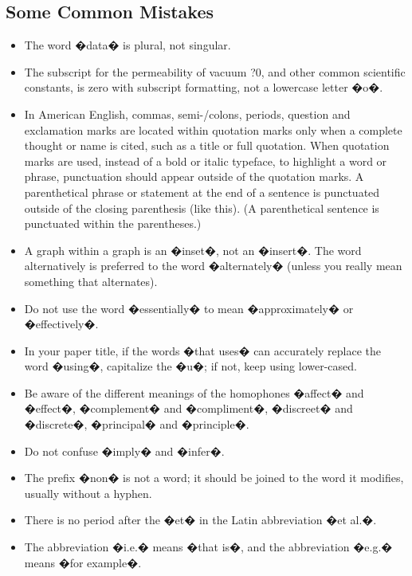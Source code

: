 \documentclass[letterpaper, 10 pt, conference]{IEEEconf}  %
\begin{document}
        \subsection{Some Common Mistakes}
        \begin{itemize}
        
        
        \item The word �data� is plural, not singular.
        \item The subscript for the permeability of vacuum ?0, and other common scientific constants, is zero with subscript formatting, not a lowercase letter �o�.
        \item In American English, commas, semi-/colons, periods, question and exclamation marks are located within quotation marks only when a complete thought or name is cited, such as a title or full quotation. When quotation marks are used, instead of a bold or italic typeface, to highlight a word or phrase, punctuation should appear outside of the quotation marks. A parenthetical phrase or statement at the end of a sentence is punctuated outside of the closing parenthesis (like this). (A parenthetical sentence is punctuated within the parentheses.)
        \item A graph within a graph is an �inset�, not an �insert�. The word alternatively is preferred to the word �alternately� (unless you really mean something that alternates).
        \item Do not use the word �essentially� to mean �approximately� or �effectively�.
        \item In your paper title, if the words �that uses� can accurately replace the word �using�, capitalize the �u�; if not, keep using lower-cased.
        \item Be aware of the different meanings of the homophones �affect� and �effect�, �complement� and �compliment�, �discreet� and �discrete�, �principal� and �principle�.
        \item Do not confuse �imply� and �infer�.
        \item The prefix �non� is not a word; it should be joined to the word it modifies, usually without a hyphen.
        \item There is no period after the �et� in the Latin abbreviation �et al.�.
        \item The abbreviation �i.e.� means �that is�, and the abbreviation �e.g.� means �for example�.
        
        \end{itemize}
        
\end{document}
